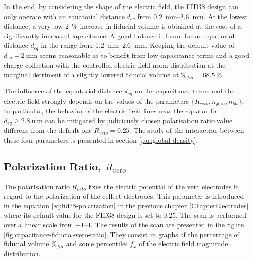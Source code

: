 In the end, by considering the shape of the electric field, the FID38 design can only operate with an equatorial distance $d_{eq}$ from \SIrange{0.2}{2.6}{\mm}. At the lowest distance, a very low \SI{2}{\percent} increase in fiducial volume is obtained at the cost of a significantly increased capacitance. A good balance is found for an equatorial distance $d_{eq}$ in the range from \SIrange{1.2}{2.6}{\mm}. Keeping the default value of $d_{eq} = \SI{2}{\mm}$ seems reasonable as to benefit from low capacitance terms and a good charge collection with the controlled electric field norm distribution at the marginal detriment of a slightly lowered fiducial volume at $\%_{fid}=\SI{68.5}{\percent}$.

The influence of the equatorial distance $d_{eq}$ on the capacitance terms and the electric field strongly depends on the values of the parameters $\{R_{veto}, n_{plan}, n_{lat} \}$. In particular, the behavior of the electric field lines near the equator for $d_{eq} \geq \SI{2.8}{\mm}$ can be mitigated by  judiciously chosen polarization ratio value different from the default one $R_{veto} = \num{0.25}$. The study of the interaction between these four parameters is presented in section \ref{par:global-density}.



\subsection{Polarization Ratio, $R_{veto}$}
\label{par:veto-ratio}

The polarization ratio $R_{veto}$ fixes the electric potential of the veto electrodes in regard to the polarization of the collect electrodes. This parameter is introduced in the equation \ref{eq:fid38-polarization} in the previous chapter \ref{ChapterElectrodes} where its default value for the FID38 design is set to $0.25$. The scan is performed over a linear scale from \SIrange{-1}{1}{}. The results of the scan are presented in the figure \ref{fig:capacitance-fiducial-veto-ratio}. They consist in graphs of the percentage of fiducial volume $\%_{fid}$ and some percentiles $f_x$ of the electric field magnitude distribution. 

